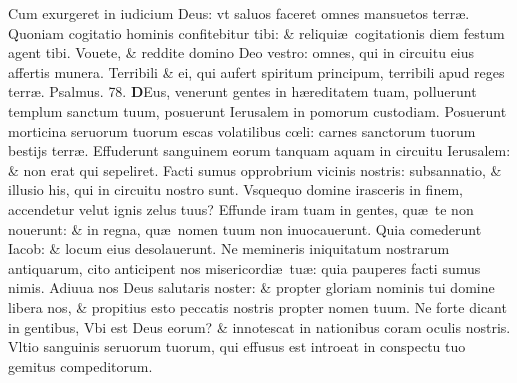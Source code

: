 \documentclass[a5paper,10pt]{book}
\def\ae{æ}
\def\oe{œ}
\begin{document}
\begin{multicols*}{2}
\newline \color{red} C\color{black}um exurgeret in iudicium Deus: vt saluos faceret omnes mansuetos terr\ae .
\newline \color{red} Q\color{black}uoniam cogitatio hominis confitebitur tibi: \& reliqui\ae \ cogitationis diem festum agent tibi.
\newline \color{red} V\color{black}ouete, \& reddite domino Deo vestro: omnes, qui in circuitu eius affertis munera.
\newline \color{red} T\color{black}erribili \& ei, qui aufert spiritum principum, terribili apud reges terr\ae .
\newline \color{red} Psalmus. \hypertarget{ps78}{78.} \color{black}
\vspace{-.25em}
\lettrine[lines=2]{\bfseries \color{red} D}{}Eus, venerunt gentes in h\ae reditatem tuam, polluerunt templum sanctum tuum, posuerunt Ierusalem in pomorum custodiam.
\newline \color{red} P\color{black}osuerunt morticina seruorum tuorum escas volatilibus c\oe li: carnes sanctorum tuorum bestijs terr\ae .
\newline \color{red} E\color{black}ffuderunt sanguinem eorum tanquam aquam in circuitu Ierusalem: \& non erat qui sepeliret.
\newline \color{red} F\color{black}acti sumus opprobrium vicinis nostris: subsannatio, \& illusio his, qui in circuitu nostro sunt.
\newline \color{red} V\color{black}squequo domine irasceris in finem, accendetur velut ignis zelus tuus?
\newline \color{red} E\color{black}ffunde iram tuam in gentes, qu\ae \ te non nouerunt: \& in regna, qu\ae \ nomen tuum non inuocauerunt.
\newline \color{red} Q\color{black}uia comederunt Iacob: \& locum eius desolauerunt.
\newline \color{red} N\color{black}e memineris iniquitatum nostrarum antiquarum, cito anticipent nos misericordi\ae \ tu\ae : quia pauperes facti sumus nimis.
\newline \color{red} A\color{black}diuua nos Deus salutaris noster: \& propter gloriam nominis tui domine libera nos, \& propitius esto peccatis nostris propter nomen tuum.
\newline \color{red} N\color{black}e forte dicant in gentibus, Vbi est Deus eorum? \& innotescat in nationibus coram oculis nostris.
\newline \color{red} V\color{black}ltio sanguinis seruorum tuorum, qui effusus est introeat in conspectu tuo gemitus compeditorum.

\end{multicols*}
\end{document}
